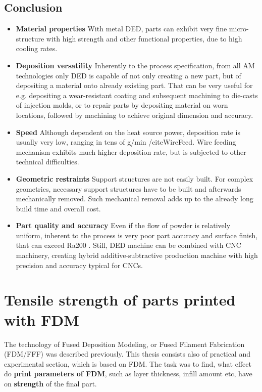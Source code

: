 \documentclass[a4paper, twoside, 11pt]{report}
\newcommand\pro{\item[$+$]}
\newcommand\con{\item[$-$]}
\begin{document}
\section{Conclusion}
\begin{itemize}
\pro \textbf{Material properties}
With metal DED, parts can exhibit very fine micro-structure with high strength and other functional properties, due to high cooling rates.

\pro \textbf{Deposition versatility}
Inherently to the process specification, from all AM technologies only DED is capable of not only creating a new part, but of depositing a material onto already existing part. That can be very useful for e.g. depositing a wear-resistant coating and subsequent machining to die-casts of injection molds, or to repair parts by depositing material on worn locations, followed by machining to achieve original dimension and accuracy.

\con \textbf{Speed}
Although dependent on the heat source power, deposition rate is usually very low, ranging in tens of g/min /cite{WireFeed}. Wire feeding mechanism exhibits much higher deposition rate, but is subjected to other technical difficulties.

\con \textbf{Geometric restraints}
Support structures are not easily built. For complex geometries, necessary support structures have to be built and afterwards mechanically removed. Such mechanical removal adds up to the already long build time and overall cost.

\con \textbf{Part quality and accuracy}
Even if the flow of powder is relatively uniform, inherent to the process is very poor part accuracy and surface finish, that can exceed Ra200 \cite{WireFeed}. Still, DED machine can be combined with CNC machinery, creating hybrid additive-subtractive production machine with high precision and accuracy typical for CNCs.
\end{itemize}


\chapter{Tensile strength of parts printed with FDM}
The technology of Fused Deposition Modeling, or Fused Filament Fabrication (FDM/FFF) was described previously. This thesis consists also of practical and experimental section, which is based on FDM. The task was to find, what effect do \textbf{print parameters of FDM}, such as layer thickness, infill amount etc, have on \textbf{strength} of the final part.\\
\end{document}
